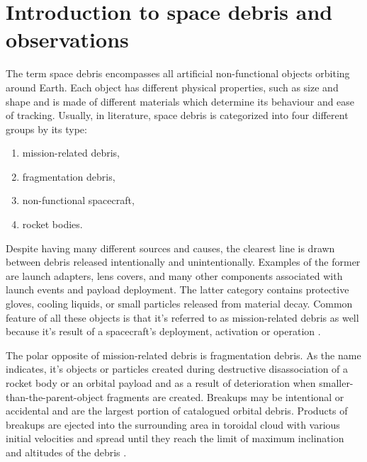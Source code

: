 \chapter{Introduction to space debris and observations}\label{chap:introduction}

The term space debris encompasses all artificial non-functional objects orbiting around Earth. Each object has different physical properties, such as size and shape and is made of different materials which determine its behaviour and ease of tracking. Usually, in literature, space debris is categorized into four different groups by its type:
\begin{enumerate}
	\item mission-related debris,
	\item fragmentation debris,
	\item non-functional spacecraft,
	\item rocket bodies.
\end{enumerate}

	Despite having many different sources and causes, the clearest line is drawn between debris released intentionally and unintentionally. Examples of the former are launch adapters, lens covers, and many other components associated with launch events and payload deployment. The latter category contains protective gloves, cooling liquids, or small particles released from material decay. Common feature of all these objects is that it’s referred to as mission-related debris as well because it’s result of a spacecraft’s deployment, activation or operation \citep{klinkrad2006space}.
	
	The polar opposite of mission-related debris is fragmentation debris. As the name indicates, it’s objects or particles created during destructive disassociation of a rocket body or an orbital payload and as a result of deterioration when smaller-than-the-parent-object fragments are created. Breakups may be intentional or accidental and are the largest portion of catalogued orbital debris. Products of breakups are ejected into the surrounding area in toroidal cloud with various initial velocities and spread until they reach the limit of maximum inclination and altitudes of the debris \citep{united1999technical}.
	

